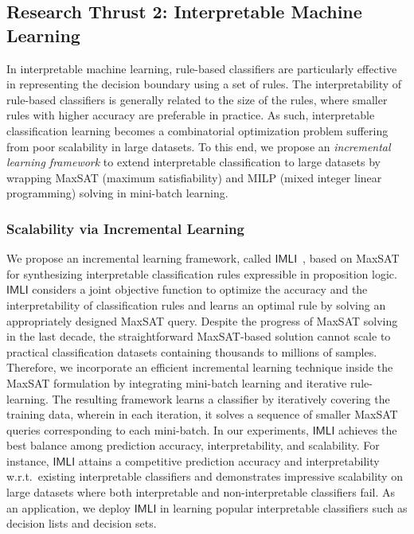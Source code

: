 \documentclass[11pt]{article}
\begin{document}
	
	
	\subsection*{Research Thrust 2: Interpretable Machine Learning}

	In interpretable machine learning, rule-based classifiers are particularly effective in representing the decision boundary using a set of rules. The interpretability of rule-based classifiers is generally related to the size of the rules, where smaller rules with higher accuracy are preferable in practice. As such, interpretable classification learning becomes a combinatorial optimization problem suffering from poor scalability in large datasets. To this end, we propose an \textit{incremental learning framework} to extend interpretable classification to large datasets by wrapping MaxSAT (maximum satisfiability) and MILP (mixed integer linear programming) solving in mini-batch learning.
	
	\subsubsection*{Scalability via Incremental Learning}
	We propose an incremental learning framework, called $ \mathsf{IMLI} $~\cite{ghosh22efficient,ghosh2019incremental},  based on MaxSAT for synthesizing interpretable classification rules expressible in proposition logic. $ \mathsf{IMLI} $ considers a joint objective function to optimize the accuracy and the interpretability of classification rules and learns an optimal rule by solving an appropriately designed MaxSAT query. Despite the progress of MaxSAT solving in the last decade, the straightforward MaxSAT-based solution cannot scale to practical classification datasets containing thousands to millions of samples. Therefore, we incorporate an efficient incremental learning technique inside the MaxSAT formulation by integrating mini-batch learning and iterative rule-learning. The resulting framework learns a classifier by iteratively covering the training data, wherein in each iteration, it solves a sequence of smaller MaxSAT queries corresponding to each mini-batch. In our experiments, $ \mathsf{IMLI} $ achieves the best balance among prediction accuracy, interpretability, and scalability. For instance, $ \mathsf{IMLI} $ attains a competitive prediction accuracy and interpretability w.r.t.\ existing interpretable classifiers and demonstrates impressive scalability on large datasets where both interpretable and non-interpretable classifiers fail. As an application, we deploy $ \mathsf{IMLI} $ in learning popular interpretable classifiers such as decision lists and decision sets.
	
\end{document}
